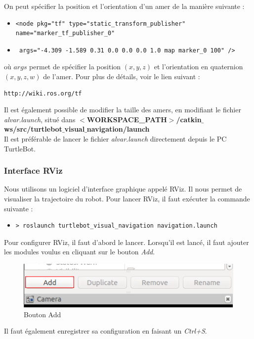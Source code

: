 \documentclass[10pt,a4paper]{article}
\begin{document}
On peut spécifier la position et l'orientation d'un amer de la manière suivante :
\begin{itemize}
\item[]  \begin{verbatim}<node pkg="tf" type="static_transform_publisher" name="marker_tf_publisher_0" \end{verbatim}
\item[] \begin{verbatim} args="-4.309 -1.589 0.31 0.0 0.0 0.0 1.0 map marker_0 100" /> \end{verbatim}
\end{itemize}
où $args$ permet de spécifier la position $(x,y,z)$ et l'orientation en quaternion $(x,y,z,w)$ de l'amer.
Pour plus de détails, voir le lien suivant :
\begin{verbatim}
http://wiki.ros.org/tf
\end{verbatim}



Il est également possible de modifier la taille des amers, en modifiant le fichier \upshape \emph{alvar.launch}, situé dans 
\textbf{$<$WORKSPACE\_PATH$>$/catkin$\_$ws/src/turtlebot$\_$visual$\_$navigation/launch} \\
Il est préférable de lancer le fichier \upshape \emph{alvar.launch} directement depuis le PC TurtleBot.


\subsubsection{Interface RViz}
\label{sec:interface}

Nous utilisons un logiciel d'interface graphique appelé RViz. Il nous permet de visualiser la trajectoire du robot. Pour lancer RViz, il faut exécuter la commande suivante :
\begin{itemize}
\item[] \begin{verbatim}> roslaunch turtlebot_visual_navigation navigation.launch \end{verbatim}
\end{itemize}

Pour configurer RViz, il faut d'abord le lancer. Lorsqu'il est lancé, il faut ajouter les modules voulus en cliquant sur le bouton \upshape \emph{Add}. \\

\begin{figure}[!h]
  \centering
  \noindent\includegraphics[scale=0.5]{Add.png} 
  \caption{Bouton Add}
\end{figure}
Il faut également enregistrer sa configuration en faisant un \upshape \emph{Ctrl+S}.
\end{document}
